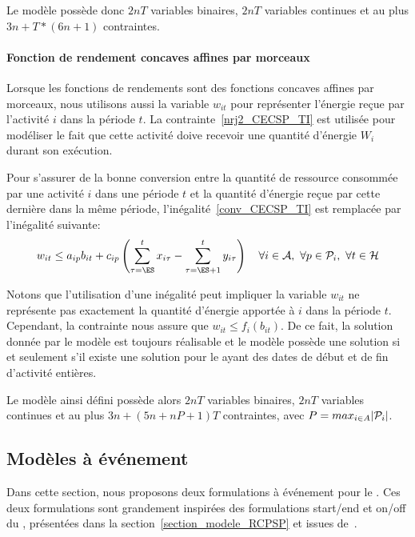 Le modèle possède donc $2nT$ variables binaires, $2nT$ variables
continues et au plus $3n+T*(6n+1)$ contraintes.

\paragraph{Fonction de rendement concaves affines par morceaux}

Lorsque les fonctions de rendements sont des fonctions concaves
affines par morceaux, nous utilisons aussi la variable $w_{it}$ pour
représenter l'énergie reçue par l'activité $i$ dans la période $t$. La
contrainte~\eqref{nrj2_CECSP_TI} est utilisée pour modéliser le fait
que cette activité doive recevoir une quantité d'énergie $W_i$ durant
son exécution. 

Pour s'assurer de la bonne conversion entre la quantité de ressource
consommée par une activité $i$ dans une période $t$ et la quantité
d'énergie reçue par cette dernière dans la même période,
l'inégalité~\eqref{conv_CECSP_TI} est remplacée par l'inégalité
suivante: 
\begin{equation}
w_{it} \le a_{ip}b_{it} + c_{ip}\left(\sum_{\tau=\ES}^t
x_{i\tau}-\sum_{\tau=\ES+1}^t y_{i\tau}\right) \quad  \forall i \in
\A,\ \forall p \in \P_i,\ \forall t \in \H 
\label{conv_CECSP_TI}
\end{equation}

Notons que l'utilisation d'une inégalité peut impliquer la variable
$w_{it}$ ne représente pas exactement la quantité d'énergie apportée à
$i$ dans la période $t$. Cependant, la contrainte nous assure que
$w_{it} \le f_i(b_{it})$. De ce fait, la solution donnée par le modèle
est toujours réalisable et le modèle possède une solution si et
seulement s'il existe une solution pour le \CECSP ayant des dates de
début et de fin d'activité entières.

Le modèle ainsi défini possède alors $2nT$ variables binaires, $2nT$
variables continues et au plus $3n + (5n +nP+1)T$ contraintes, avec
$P=max_{i\in A}|\P_i|$.  

\subsection{Modèles à événement}

Dans cette section, nous proposons deux formulations à événement pour
le \CECSP. Ces deux formulations sont grandement inspirées des
formulations start/end et on/off du \RCPSP, présentées dans la
section~\ref{section_modele_RCPSP} et issues de~\cite{modele_RCPSP}.

